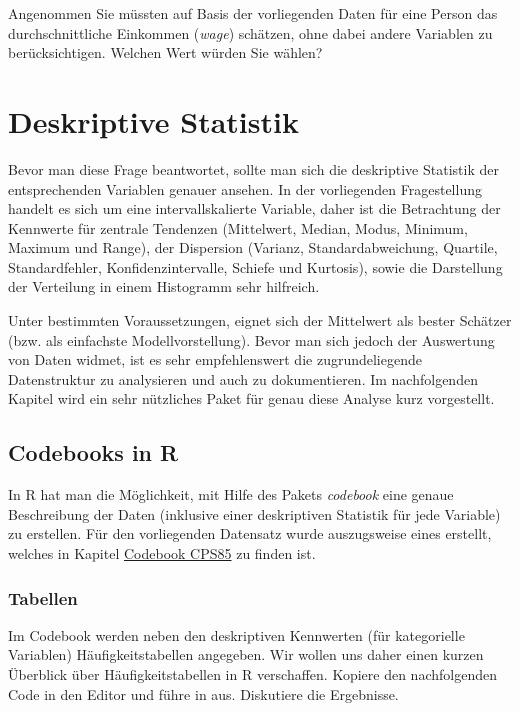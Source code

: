 \documentclass[]{article}
\begin{document}
Angenommen Sie müssten auf Basis der vorliegenden Daten für eine Person
das durchschnittliche Einkommen (\emph{wage}) schätzen, ohne dabei
andere Variablen zu berücksichtigen. Welchen Wert würden Sie wählen?

\section*{Deskriptive Statistik}\label{deskriptive-statistik-1}

Bevor man diese Frage beantwortet, sollte man sich die deskriptive
Statistik der entsprechenden Variablen genauer ansehen. In der
vorliegenden Fragestellung handelt es sich um eine intervallskalierte
Variable, daher ist die Betrachtung der Kennwerte für zentrale Tendenzen
(Mittelwert, Median, Modus, Minimum, Maximum und Range), der Dispersion
(Varianz, Standardabweichung, Quartile, Standardfehler,
Konfidenzintervalle, Schiefe und Kurtosis), sowie die Darstellung der
Verteilung in einem Histogramm sehr hilfreich.

Unter bestimmten Voraussetzungen, eignet sich der Mittelwert als bester
Schätzer (bzw. als einfachste Modellvorstellung). Bevor man sich jedoch
der Auswertung von Daten widmet, ist es sehr empfehlenswert die
zugrundeliegende Datenstruktur zu analysieren und auch zu dokumentieren.
Im nachfolgenden Kapitel wird ein sehr nützliches Paket für genau diese
Analyse kurz vorgestellt.

\hypertarget{codebooks-in-r}{\subsection*{Codebooks in
R}\label{codebooks-in-r}}

In R hat man die Möglichkeit, mit Hilfe des Pakets \emph{codebook} eine
genaue Beschreibung der Daten (inklusive einer deskriptiven Statistik
für jede Variable) zu erstellen. Für den vorliegenden Datensatz wurde
auszugsweise eines erstellt, welches in Kapitel
\protect\hyperlink{codebook-cps85}{Codebook CPS85} zu finden ist.

\subsubsection*{Tabellen}\label{tabellen}

Im Codebook werden neben den deskriptiven Kennwerten (für kategorielle
Variablen) Häufigkeitstabellen angegeben. Wir wollen uns daher einen
kurzen Überblick über Häufigkeitstabellen in R verschaffen. Kopiere den
nachfolgenden Code in den Editor und führe in aus. Diskutiere die
Ergebnisse.
\end{document}
